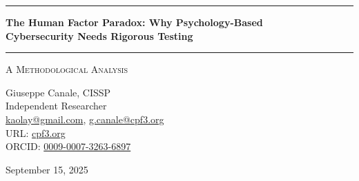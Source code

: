 \documentclass[11pt,a4paper]{article}
\begin{document}
\thispagestyle{empty}
\begin{center}

\vspace*{0.5cm}
\rule{\textwidth}{1.5pt}
\vspace{0.5cm}

{\LARGE \textbf{The Human Factor Paradox: Why Psychology-Based}}\\[0.3cm]
{\LARGE \textbf{Cybersecurity Needs Rigorous Testing}}

\vspace{0.5cm}
\rule{\textwidth}{1.5pt}
\vspace{0.3cm}

{\large \textsc{A Methodological Analysis}}

\vspace{0.5cm}

{\Large Giuseppe Canale, CISSP}\\[0.2cm]
Independent Researcher\\[0.1cm]
\href{mailto:kaolay@gmail.com}{kaolay@gmail.com}, 
\href{mailto:g.canale@cpf3.org}{g.canale@cpf3.org}\\[0.1cm]
URL: \href{https://cpf3.org}{cpf3.org}\\[0.1cm]
ORCID: \href{https://orcid.org/0009-0007-3263-6897}{0009-0007-3263-6897}

\vspace{0.8cm}
{\large September 15, 2025}
\vspace{1cm}

\end{center}
\end{document}
